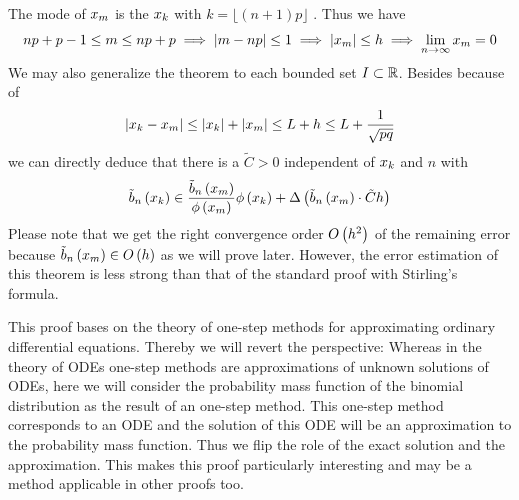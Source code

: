 \begin{remark} \label{remark:alt_local}
  The mode of $\xnp$ is the $\x[k]$ with $k = \lfloor (n+1)p \rfloor$ \cite{nicolas}\cite{wiki:binomial_distribution}. Thus we have
  \begin{align}
    np+p-1 \le \knp \le np+p \implies \abs{\knp-np} \le 1 \implies \abs{\xnp} \le h \implies \lim_{n\to\infty} \xnp = 0
  \end{align}
  We may also generalize the theorem to each bounded set $I \subset \R$. Besides because of
  \begin{align}
    \abs{\x[k]-\xnp} \le \abs{\x[k]}+\abs{\xnp} \le L + h \le L + \frac{1}{\sqrt{pq}}
  \end{align}
  we can directly deduce that there is a $\tilde C > 0$ independent of $\x$ and $n$ with
  \begin{align}
    \bb{\x} \in \frac{\bnp}{\fphi{\xnp}}\fphi{\x} + \bigabs{{\bnp}\cdot \tilde Ch}
  \end{align}
  Please note that we get the right convergence order $\bigo{h^2}$ of the remaining error because $\bnp \in \bigo{h}$ as we will prove later. However, the error estimation of this theorem is less strong than that of the standard proof with Stirling's formula.
\end{remark}

This proof bases on the theory of one-step methods for approximating ordinary differential equations. Thereby we will revert the perspective: Whereas in the theory of ODEs one-step methods are approximations of unknown solutions of ODEs, here we will consider the probability mass function of the binomial distribution as the result of an one-step method. This one-step method corresponds to an ODE and the solution of this ODE will be an approximation to the probability mass function. Thus we flip the role of the exact solution and the approximation. This makes this proof particularly interesting and may be a method applicable in other proofs too.

